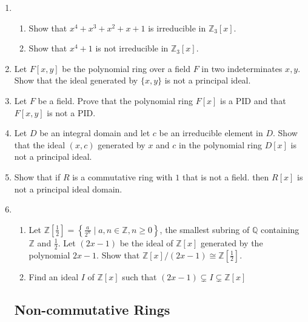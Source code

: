 \documentclass{article}
\theoremstyle{definition}
\newcommand{\Z}{\mathbb{Z}}
\newcommand{\Q}{\mathbb{Q}}
\newcommand{\set}[1]{\left\{#1\right\}}
\begin{document}
\begin{enumerate}
            \item
            
            \begin{enumerate}
                \item Show that $x^4+x^3+x^2+x+1$ is irreducible in $\Z_3[x]$.
                \item Show that $x^4+1$ is not irreducible in $\Z_3[x]$.
            \end{enumerate}

            \item Let $F[x,y]$ be the polynomial ring over a field $F$ in two indeterminates $x,y$. Show that the ideal generated by $\{x,y\}$ is not a principal ideal.
            
            \item Let $F$ be a field. Prove that the polynomial ring $F[x]$ is a PID and that $F[x,y]$ is not a PID.
            
            \item Let $D$ be an integral domain and let $c$ be an irreducible element in $D$. Show that the ideal $(x,c)$ generated by $x$ and $c$ in the polynomial ring $D[x]$ is not a principal ideal.
            
            \item Show that if $R$ is a commutative ring with $1$ that is not a field. then $R[x]$ is not a principal ideal domain.
            
            \item
            
            \begin{enumerate}
                \item Let $\Z[\frac{1}{2}]=\set{\frac{a}{2^n} \mid a,n\in \Z, n\geq 0}$, the smallest subring of $\Q$ containing $\Z$ and $\frac{1}{2}$. Let $(2x-1)$ be the ideal of $\Z[x]$ generated by the polynomial $2x-1$. Show that $\Z[x]/(2x-1) \cong \Z[\frac{1}{2}]$.
                \item Find an ideal $I$ of $\Z[x]$ such that $(2x-1)\subsetneq I \subsetneq \Z[x]$
            \end{enumerate}

        \subsection{Non-commutative Rings}


\end{enumerate}
\end{document}
